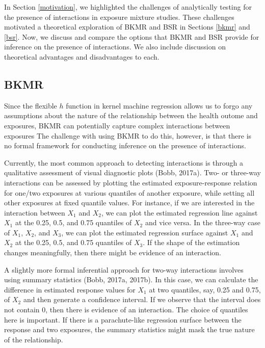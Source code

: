 \documentclass[12pt, twoside]{amherstthesis}
\begin{document}
In Section \ref{motivation}, we highlighted the challenges of analytically testing for the presence of interactions in exposure mixture studies. These challenges motivated a theoretical exploration of BKMR and BSR in Sections \ref{bkmr} and \ref{bsr}. Now, we discuss and compare the options that BKMR and BSR provide for inference on the presence of interactions. We also include discussion on theoretical advantages and disadvantages to each.

\hypertarget{bkmr-1}{%
\subsection{BKMR}\label{bkmr-1}}

Since the flexible \(h\) function in kernel machine regression allows us to forgo any assumptions about the nature of the relationship between the health outome and exposures, BKMR can potentially capture complex interactions between exposures The challenge with using BKMR to do this, however, is that there is no formal framework for conducting inference on the presence of interactions.

Currently, the most common approach to detecting interactions is through a qualitative assessment of visual diagnostic plots (Bobb, 2017a). Two- or three-way interactions can be assessed by plotting the estimated exposure-response relation for one/two exposures at various quantiles of another exposure, while setting all other exposures at fixed quantile values. For instance, if we are interested in the interaction between \(X_1\) and \(X_2\), we can plot the estimated regression line against \(X_1\) at the 0.25, 0.5, and 0.75 quantiles of \(X_2\) and vice versa. In the three-way case of \(X_1\), \(X_2\), and \(X_3\), we can plot the estimated regression surface against \(X_1\) and \(X_2\) at the 0.25, 0.5, and 0.75 quantiles of \(X_3\). If the shape of the estimation changes meaningfully, then there might be evidence of an interaction.

A slightly more formal inferential approach for two-way interactions involves using summary statistics (Bobb, 2017a, 2017b). In this case, we can calculate the difference in estimated response values for \(X_1\) at two quantiles, say, 0.25 and 0.75, of \(X_2\) and then generate a confidence interval. If we observe that the interval does not contain 0, then there is evidence of an interaction. The choice of quantiles here is important. If there is a parachute-like regression surface between the response and two exposures, the summary statistics might mask the true nature of the relationship.
\end{document}
